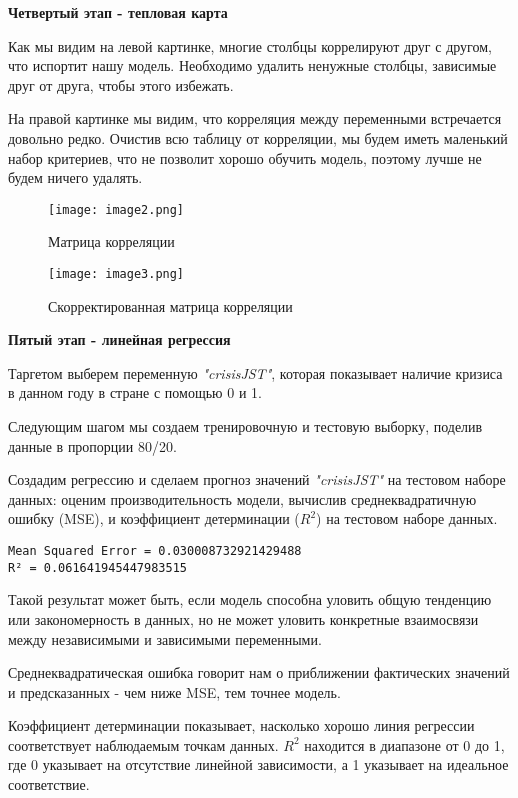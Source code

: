 \documentclass[12pt]{article}
\begin{document}
\textbf{Четвертый этап - тепловая карта}
\par Как мы видим на левой картинке, многие столбцы коррелируют друг с другом, что испортит нашу модель. Необходимо удалить ненужные столбцы, зависимые друг от друга, чтобы этого избежать.

На правой картинке мы видим, что корреляция между переменными встречается довольно редко. Очистив всю таблицу от корреляции, мы будем иметь маленький набор критериев, что не позволит хорошо обучить модель, поэтому лучше не будем ничего удалять.

\begin{figure}[h]
    \begin{minipage}[t]{0.49\linewidth}
    \texttt{[image: image2.png]}
    \centering
    \caption{Матрица корреляции}
    \label{fig:img1}
  \end{minipage}
  \begin{minipage}[t]{0.49\linewidth}
    \texttt{[image: image3.png]}
    \centering
    \caption{Скорректированная матрица корреляции}
    \label{fig:img2}
  \end{minipage}
\end{figure}

\textbf{Пятый этап - линейная регрессия}
\par Таргетом выберем переменную  \textit{"crisisJST"{}}, которая показывает наличие кризиса в данном году в стране с помощью 0 и 1.

Следующим шагом мы создаем тренировочную и тестовую выборку, поделив данные в пропорции 80/20.

Создадим регрессию и сделаем прогноз значений \textit{"crisisJST"{}} на тестовом наборе данных: оценим производительность модели, вычислив среднеквадратичную ошибку (MSE), и коэффициент детерминации ($R^2$) на тестовом наборе данных.
\begin{verbatim}
Mean Squared Error = 0.030008732921429488
R² = 0.061641945447983515
\end{verbatim}

Такой результат может быть, если модель способна уловить общую тенденцию или закономерность в данных, но не может уловить конкретные взаимосвязи между независимыми и зависимыми переменными.

Среднеквадратическая ошибка говорит нам о приближении фактических значений и предсказанных - чем ниже MSE, тем точнее модель.

Коэффициент детерминации показывает, насколько хорошо линия регрессии соответствует наблюдаемым точкам данных. $R^2$ находится в диапазоне от 0 до 1, где 0 указывает на отсутствие линейной зависимости, а 1 указывает на идеальное соответствие.
\end{document}
